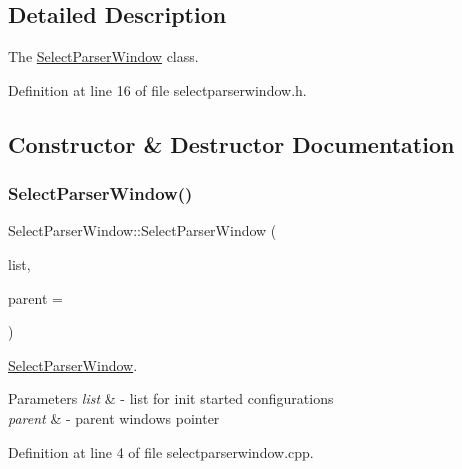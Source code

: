 \subsection{Detailed Description}
The \hyperlink{class_select_parser_window}{Select\+Parser\+Window} class. 

Definition at line 16 of file selectparserwindow.\+h.



\subsection{Constructor \& Destructor Documentation}
\mbox{\label{class_select_parser_window_a8d16e81dd47f921fae24e502c5394944}} 
\subsubsection{\texorpdfstring{Select\+Parser\+Window()}{SelectParserWindow()}}
{\footnotesize\ttfamily Select\+Parser\+Window\+::\+Select\+Parser\+Window (\begin{DoxyParamCaption}\item[{Q\+List$<$ \hyperlink{class_parser_config}{Parser\+Config} $\ast$$>$ $\ast$}]{list,  }\item[{Q\+Widget $\ast$}]{parent = {} }\end{DoxyParamCaption})}



\hyperlink{class_select_parser_window}{Select\+Parser\+Window}. 


\begin{DoxyParams}{Parameters}
{\em list} & -\/ list for init started configurations \\
\hline
{\em parent} & -\/ parent windows pointer \\
\hline
\end{DoxyParams}


Definition at line 4 of file selectparserwindow.\+cpp.


